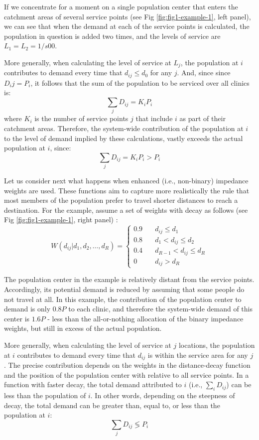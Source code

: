 \documentclass[10pt,letterpaper]{article}
\begin{document}
If we concentrate for a moment on a single population center that enters
the catchment areas of several service points (see Fig
\ref{fig:fig1-example-1}, left panel), we can see that when the demand
at each of the service points is calculated, the population in question
is added two times, and the levels of service are \(L_1=L_2=1/s00\).

More generally, when calculating the level of service at \(L_j\), the
population at \(i\) contributes to demand every time that
\(d_{ij} \le d_0\) for any \(j\). And, since since \(D_ij = P_i\), it
follows that the sum of the population to be serviced over all clinics
is: \[
\sum_j D_{ij} = K_iP_i
\] where \(K_i\) is the number of service points \(j\) that include
\(i\) as part of their catchment areas. Therefore, the system-wide
contribution of the population at \(i\) to the level of demand implied
by these calculations, vastly exceeds the actual population at \(i\),
since: \[
\sum_j D_{ij} = K_iP_i > P_i
\]

Let us consider next what happens when enhanced (i.e., non-binary)
impedance weights are used. These functions aim to capture more
realistically the rule that most members of the population prefer to
travel shorter distances to reach a destination. For the example, assume
a set of weights with decay as follows (see Fig
\ref{fig:fig1-example-1}, right panel) : \[
W(d_{ij}|d_1, d_2, \dots, d_R) = \left\{
        \begin{array}{ll}
            0.9 & \quad d_{ij} \leq d_1 \\
            0.8 & \quad d_1 < d_{ij} \leq d_2 \\
            0.4 & \quad d_{R-1} < d_{ij} \leq d_R \\
            0 & \quad d_{ij} > d_R
        \end{array}
    \right.
\]

The population center in the example is relatively distant from the
service points. Accordingly, its potential demand is reduced by assuming
that some people do not travel at all. In this example, the contribution
of the population center to demand is only \(0.8P\) to each clinic, and
therefore the system-wide demand of this center is \(1.6P\) - less than
the all-or-nothing allocation of the binary impedance weights, but still
in excess of the actual population.

More generally, when calculating the level of service at \(j\)
locations, the population at \(i\) contributes to demand every time that
\(d_{ij}\) is within the service area for any \(j\). The precise
contribution depends on the weights in the distance-decay function and
the position of the population center with relative to all service
points. In a function with faster decay, the total demand attributed to
\(i\) (i.e., \(\sum_i D_{ij}\)) can be less than the population of
\(i\). In other words, depending on the steepness of decay, the total
demand can be greater than, equal to, or less than the population at
\(i\): \[
\sum_j D_{ij} \lessgtr P_i
\]
\end{document}
